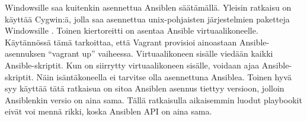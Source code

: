 Windowsille saa kuitenkin asennettua Ansiblen säätämällä. Yleisin ratkaisu on käyttää Cygwin:ä, jolla saa asennettua unix-pohjaisten järjestelmien paketteja Windowsille \cite{link:cygwin}. Toinen kiertoreitti on asentaa Ansible virtuaalikoneelle. Käytännössä tämä tarkoittaa, että Vagrant provisioi ainoastaan Ansible-asennuksen \enquote{vagrant up} vaiheessa. Virtuaalikoneen sisälle viedään kaikki Ansible-skriptit. Kun on siirrytty virtuaalikoneen sisälle, voidaan ajaa Ansible-skriptit. Näin isäntäkoneella ei tarvitse olla asennettuna Ansiblea. Toinen hyvä syy käyttää tätä ratkaisua on sitoa Ansiblen asennus tiettyy versioon, jolloin Ansiblenkin versio on aina sama. Tällä ratkaisulla aikaisemmin luodut playbookit eivät voi mennä rikki, koska Ansiblen API on aina sama.